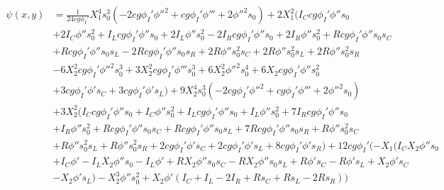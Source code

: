 \documentclass[ENG]{fancynotes}
\begin{document}
\begin{equation}
\begin{aligned}
\psi(x,y)&= \frac{1}{24 c g \phi_I'} X_{1}^{4} s_{0}^{3} (- 2 c g \phi_I' \phi''^{2} + c g \phi_I' \phi''' + 2 \phi''^{2} s_{0}) + 2 X_{1}^{2} (I_{C} c g \phi_I' \phi'' s_{0}\\
&+ 2 I_{C} \phi'' s_{0}^{2} + I_{L} c g \phi_I' \phi'' s_{0} + 2 I_{L} \phi'' s_{0}^{2} - 2 I_{R} c g \phi_I' \phi'' s_{0} + 2 I_{R} \phi'' s_{0}^{2} + R c g \phi_I' \phi'' s_{0} s_{C}  \\
&+ R c g \phi_I' \phi'' s_{0} s_{L} - 2 R c g \phi_I' \phi'' s_{0} s_{R} + 2 R \phi'' s_{0}^{2} s_{C} + 2 R \phi'' s_{0}^{2} s_{L} + 2 R \phi'' s_{0}^{2} s_{R}\\
& - 6 X_{2}^{2} c g \phi_I' \phi''^{2} s_{0}^{3} + 3 X_{2}^{2} c g \phi_I' \phi''' s_{0}^{3} + 6 X_{2}^{2} \phi''^{2} s_{0}^{4} + 6 X_{2} c g \phi_I' \phi'' s_{0}^{2}  \\
& + 3 c g \phi_I' \phi' s_{C} + 3 c g \phi_I' \phi' s_{L}) + 9 X_{2}^{4} s_{0}^{3} (- 2 c g \phi_I' \phi''^{2} + c g \phi_I' \phi''' + 2 \phi''^{2} s_{0}) \\
& + 3 X_{2}^{2} (I_{C} c g \phi_I' \phi'' s_{0} + I_{C} \phi'' s_{0}^{2} + I_{L} c g \phi_I' \phi'' s_{0} + I_{L} \phi'' s_{0}^{2} + 7 I_{R} c g \phi_I' \phi'' s_{0}  \\
& +   I_{R} \phi'' s_{0}^{2} + R c g \phi_I' \phi'' s_{0} s_{C} + R c g \phi_I' \phi'' s_{0} s_{L} + 7 R c g \phi_I' \phi'' s_{0} s_{R} + R \phi'' s_{0}^{2} s_{C} \\
& + R \phi'' s_{0}^{2} s_{L} + R \phi'' s_{0}^{2} s_{R} + 2 c g \phi_I' \phi' s_{C} + 2 c g \phi_I' \phi' s_{L} + 8 c g \phi_I' \phi' s_{R}) + 12 c g \phi_I' (- X_{1} (I_{C} X_{2} \phi'' s_{0}\\
& + I_{C} \phi' - I_{L} X_{2} \phi'' s_{0} - I_{L} \phi' + R X_{2} \phi'' s_{0} s_{C} - R X_{2} \phi'' s_{0} s_{L} + R \phi' s_{C} - R \phi' s_{L} + X_{2} \phi' s_{C}  \\
& - X_{2} \phi' s_{L}) - X_{2}^{3} \phi'' s_{0}^{2} + X_{2} \phi' (I_{C} + I_{L} - 2 I_{R} + R s_{C} + R s_{L} - 2 R s_{R}))
\\
&\end{aligned}
\end{equation}
\end{document}
